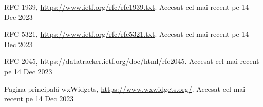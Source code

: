 \documentclass[runningheads]{llncs}
\begin{document}
\begin{thebibliography}{8}
RFC 1939, \url{https://www.ietf.org/rfc/rfc1939.txt}. Accesat cel mai recent pe 14 Dec 2023

RFC 5321, \url{https://www.ietf.org/rfc/rfc5321.txt}. Accesat cel mai recent pe 14 Dec 2023

RFC 2045, \url{https://datatracker.ietf.org/doc/html/rfc2045}. Accesat cel mai recent pe 14 Dec 2023

Pagina principală wxWidgets, \url{https://www.wxwidgets.org/}. Accesat cel mai recent pe 14 Dec 2023


\end{thebibliography}
\end{document}

